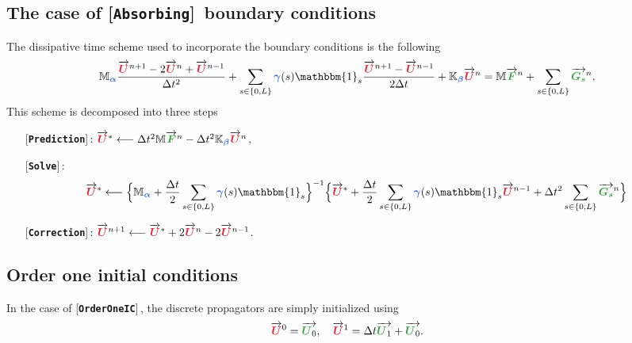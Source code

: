 \documentclass[11pt,a4paper]{article}
\newcommand{\unknown}[1]{\bm{{\color{myred}{#1}}}}
\newcommand{\param}[1]{\bm{{\color{myhyperblue}{#1}}}}
\newcommand{\data}[1]{\bm{{\color{mygreen}{#1}}}}
\newcommand{\keyword}[1]{[\texttt{\textbf{#1}}]\!\,}
\begin{document}
\subsection{The case of \keyword{Absorbing} boundary conditions}
The dissipative time scheme used to incorporate the boundary conditions is the following
\begin{equation*}
\mathbb{M}_{\param{\alpha}}\dfrac{\overrightarrow{\unknown{U}}^{n+1} - 2\overrightarrow{\unknown{U}}^{n} + \overrightarrow{\unknown{U}}^{n-1}}{\Delta t^2} + \sum_{s\in\{0, L\}} \param{\gamma}(s)\mathbbm{1}_s \dfrac{\overrightarrow{\unknown{U}}^{n+1} - \overrightarrow{\unknown{U}}^{n-1}}{2\Delta t} + \mathbb{K}_{\param{\beta}} \overrightarrow{\unknown{U}}^{n} = \mathbb{M} \overrightarrow{\data{F}}^n + \sum_{s\in\{0, L\}}  \overrightarrow{\data{G_s}}^n,
\end{equation*}
This scheme is decomposed into three steps
\begin{itemize}
\item[] \keyword{Prediction}: $\overrightarrow{\unknown{U}}^* \longleftarrow \Delta t^2 \mathbb{M} \overrightarrow{\data{F}}^n - \Delta t^2 \mathbb{K}_{\param{\beta}} \overrightarrow{\unknown{U}}^{n}$,
\item[] \keyword{Solve}: $$\overrightarrow{\unknown{U}}^* \longleftarrow \Big\{\mathbb{M}_{\param{\alpha}} + \dfrac{\Delta t}{2} \sum_{s\in\{0, L\}} \param{\gamma}(s)\mathbbm{1}_s \Big\}^{-1} \Big\{\overrightarrow{\unknown{U}}^*   + \dfrac{\Delta t}{2} \sum_{s\in\{0, L\}} \param{\gamma}(s)\mathbbm{1}_s\overrightarrow{\unknown{U}}^{n-1} + \Delta t^2 \sum_{s\in\{0, L\}}  \overrightarrow{\data{G_s}}^n \Big\}$$
\item[] \keyword{Correction}: $\overrightarrow{\unknown{U}}^{n+1} \longleftarrow \overrightarrow{\unknown{U}}^* + 2 \overrightarrow{\unknown{U}}^n - 2 \overrightarrow{\unknown{U}}^{n-1}$.
\end{itemize}

\subsection{Order one initial conditions}
In the case of \keyword{OrderOneIC}, the discrete propagators are simply initialized using
\begin{equation*}
\overrightarrow{\unknown{U}}^0 = \overrightarrow{\data{U}_0}, \quad \overrightarrow{\unknown{U}}^1 = \Delta t \overrightarrow{\data{U}_1}+ \overrightarrow{\data{U}_0}.
\end{equation*}
\end{document}
